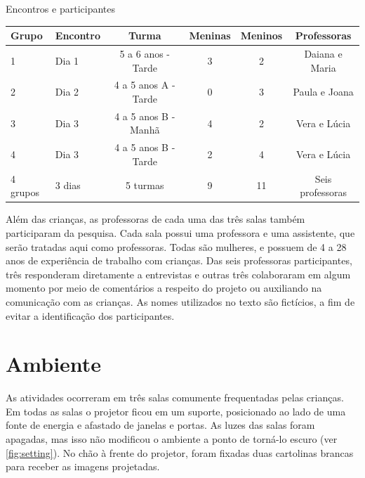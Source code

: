  \begin{quadro}[!h]
 		\setlength{\extrarowheight}{3pt}
        \begin{center}
        \caption{Encontros e participantes}
        \label{quadro:participants}
        \begin{tabular}{@{}llcccc@{}}
            \toprule
            Grupo & Encontro & Turma  & Meninas & Meninos & Professoras \\ \midrule
            1         & Dia 1                       & 5 a 6 anos - Tarde      & 3 & 2 & Daiana e Maria \\
            2         & Dia 2                       & 4 a 5 anos A - Tarde   & 0 & 3 & Paula e Joana \\
            3         & Dia 3                       & 4 a 5 anos B - Manhã & 4 & 2 & Vera e Lúcia \\
            4         & Dia 3                       & 4 a 5 anos B - Tarde   & 2 & 4 & Vera e Lúcia \\ \midrule
            4 grupos          & 3 dias        & 5 turmas     & 9 & 11 & Seis professoras \\ \bottomrule 
            \end{tabular}
        \end{center}
        \sourceauthor
    \end{quadro}

Além das crianças, as professoras de cada uma das três salas também participaram da pesquisa. Cada sala possui uma professora e uma assistente, que serão tratadas aqui como professoras. Todas são mulheres, e possuem de 4 a 28 anos de experiência de trabalho com crianças. Das seis professoras participantes, três responderam diretamente a entrevistas e outras três colaboraram em algum momento por meio de comentários a respeito do projeto ou auxiliando na comunicação com as crianças. As nomes utilizados no texto são fictícios, a fim de evitar a identificação dos participantes.

\section{Ambiente}
As atividades ocorreram em três salas comumente frequentadas pelas crianças. Em todas as salas o projetor ficou em um suporte, posicionado ao lado de uma fonte de energia e afastado de janelas e portas. As luzes das salas foram apagadas, mas isso não modificou o ambiente a ponto de torná-lo escuro (ver \autoref{fig:setting}). No chão à frente do projetor, foram fixadas duas cartolinas brancas para receber as imagens projetadas.

